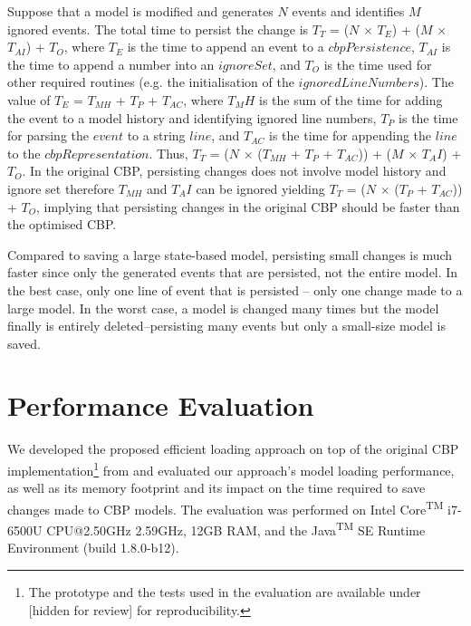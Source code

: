 \documentclass{llncs}
\begin{document}
Suppose that a model is modified and generates $N$ events and identifies $M$ ignored events. The total time to persist the change is $T_T$ = ($N$ $\times$ $T_E$) + ($M$ $\times$ $T_{AI}$) + $T_O$, where $T_E$ is the time to append an event to a $cbpPersistence$, $T_{AI}$ is the time to append a number into an $ignoreSet$, and $T_O$ is the time used for other required routines (e.g. the initialisation of the  $ignoredLineNumbers$). The value of $T_E$ = $T_{MH}$ + $T_P$ + $T_{AC}$, where $T_MH$ is the sum of the time for adding the event to a model history and identifying ignored line numbers, $T_P$ is the time for parsing the $event$ to a string $line$, and $T_{AC}$ is the time for appending the $line$ to the $cbpRepresentation$. Thus, $T_T$ = ($N$ $\times$ ($T_{MH}$ + $T_P$ + $T_{AC}$))  + ($M$ $\times$ $T_AI$) + $T_O$. In the original CBP, persisting changes does not involve model history and ignore set therefore $T_{MH}$ and $T_AI$ can be ignored yielding $T_T$ = ($N$ $\times$ ($T_P$ + $T_{AC}$)) + $T_O$, implying that persisting changes in the original CBP should be faster than the optimised CBP. 

Compared to saving a large state-based model, persisting small changes is much faster since only the generated events that are persisted, not the entire model. In the best case, only one line of event that is persisted -- only one change made to a large model. In the worst case, a model is changed many times but the model finally is entirely deleted--persisting many events but only a small-size model is saved. 


\section{Performance Evaluation}
\label{sec:performance_evaluation}
We developed the proposed efficient loading approach on top of the original CBP implementation\footnote{The prototype and the tests used in the evaluation are available under [hidden for review] for reproducibility. %
} from \cite{yohannis2017turning} and evaluated our approach's model loading performance, as well as its memory footprint and its impact on the time required to save changes made to CBP models. The evaluation was performed on Intel\textsuperscript{\textregistered} Core\textsuperscript{TM} i7-6500U CPU@2.50GHz 2.59GHz, 12GB RAM, and the Java\textsuperscript{TM} SE Runtime Environment (build 1.8.0-b12).
\end{document}
